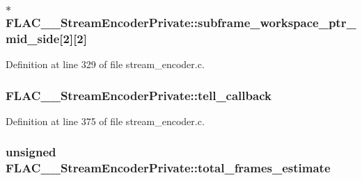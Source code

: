 \subsubsection[{\texorpdfstring{subframe\+\_\+workspace\+\_\+ptr\+\_\+mid\+\_\+side}{subframe_workspace_ptr_mid_side}}]{$\ast$ F\+L\+A\+C\+\_\+\+\_\+\+Stream\+Encoder\+Private\+::subframe\+\_\+workspace\+\_\+ptr\+\_\+mid\+\_\+side\mbox{[}2\mbox{]}\mbox{[}2\mbox{]}}\hypertarget{struct_f_l_a_c_____stream_encoder_private_a1ed6bd65d87323c2c303197fca9776d4}{}\label{struct_f_l_a_c_____stream_encoder_private_a1ed6bd65d87323c2c303197fca9776d4}


Definition at line 329 of file stream\+\_\+encoder.\+c.

\subsubsection[{\texorpdfstring{tell\+\_\+callback}{tell_callback}}]{ F\+L\+A\+C\+\_\+\+\_\+\+Stream\+Encoder\+Private\+::tell\+\_\+callback}\hypertarget{struct_f_l_a_c_____stream_encoder_private_a2fb298c9b4322a2d607e87765297a94b}{}\label{struct_f_l_a_c_____stream_encoder_private_a2fb298c9b4322a2d607e87765297a94b}


Definition at line 375 of file stream\+\_\+encoder.\+c.

\subsubsection[{\texorpdfstring{total\+\_\+frames\+\_\+estimate}{total_frames_estimate}}]{\setlength{\rightskip}{0pt plus 5cm}unsigned F\+L\+A\+C\+\_\+\+\_\+\+Stream\+Encoder\+Private\+::total\+\_\+frames\+\_\+estimate}\hypertarget{struct_f_l_a_c_____stream_encoder_private_a5c67db622829bf85f2467d13e4631719}{}\label{struct_f_l_a_c_____stream_encoder_private_a5c67db622829bf85f2467d13e4631719}


